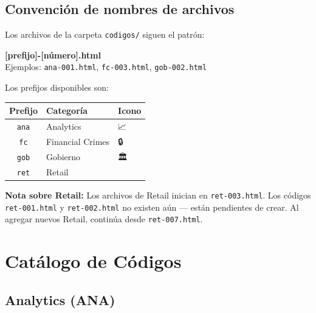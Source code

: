 \documentclass[12pt, a4paper]{article}
\newcommand{\archivo}[1]{\texttt{\textcolor{cpAccent}{#1}}}
\begin{document}
\subsection{Convención de nombres de archivos}

Los archivos de la carpeta \archivo{codigos/} siguen el patrón:

\begin{cajaCodigo}
\textbf{[prefijo]-[número].html}\\[4pt]
Ejemplos: \texttt{ana-001.html}, \texttt{fc-003.html}, \texttt{gob-002.html}
\end{cajaCodigo}

Los prefijos disponibles son:

\begin{center}
\begin{tabular}{cll}
\toprule
\textbf{Prefijo} & \textbf{Categoría} & \textbf{Icono} \\
\midrule
\texttt{ana} & Analytics           & 📈 \\
\texttt{fc}  & Financial Crimes    & 🔒 \\
\texttt{gob} & Gobierno            & 🏛️ \\
\texttt{ret} & Retail              & 🛒 \\
\bottomrule
\end{tabular}
\end{center}

\begin{cajaAviso}
    \textbf{Nota sobre Retail:} Los archivos de Retail inician en
    \archivo{ret-003.html}. Los códigos \archivo{ret-001.html} y
    \archivo{ret-002.html} no existen aún — están pendientes de crear.
    Al agregar nuevos Retail, continúa desde \archivo{ret-007.html}.
\end{cajaAviso}


\section{Catálogo de Códigos}

\subsection{Analytics (ANA)}
\end{document}

